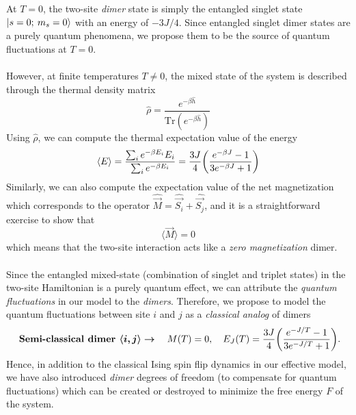 \documentclass[../journal_main.tex]{subfiles}
\begin{document}
At $T=0$, the two-site \textit{dimer} state is simply the entangled singlet state $\ket{s = 0; \: m_s = 0}$ with an energy of $-3J/4$. Since entangled singlet dimer states are a purely quantum phenomena, we propose them to be the source of quantum fluctuations at $T = 0$.~\\~\\
However, at finite temperatures $T \neq 0$, the mixed state of the system is described through the thermal density matrix 
\begin{equation}
    \hat{\rho} = \frac{e^{-\beta \hat{h}}}{\text{Tr} (e^{-\beta \hat{h}})}
\end{equation}
Using $\hat{\rho}$, we can compute the thermal expectation value of the energy 
\begin{equation}
    \expval{E} = \frac{\sum_i e^{-\beta E_i} E_i}{\sum_i e^{-\beta E_i}} = \frac{3J}{4}\qty(\frac{e^{-\beta J} - 1}{3e^{-\beta J} + 1})
\end{equation}
Similarly, we can also compute the expectation value of the net magnetization which corresponds to the operator $\hat{\vec{M}} = \hat{\vec{S_i}} + \hat{\vec{S_j}}$, and it is a straightforward exercise to show that
\begin{equation}
    \langle\vec{M}\rangle = 0 
\end{equation}
which means that the two-site interaction acts like a \textit{zero magnetization} dimer.~\\~\\
Since the entangled mixed-state (combination of singlet and triplet states) in the two-site Hamiltonian is a purely quantum effect, we can attribute the \textit{quantum fluctuations} in our model to the \textit{dimers}. Therefore, we propose to model the quantum fluctuations between site $i$ and $j$ as a \textit{classical analog} of dimers 
\begin{equation}
    \text{ \textbf{Semi-classical dimer }} \boldsymbol{\langle i,j\rangle \rightarrow} \quad M(T)=0, \quad E_J(T) = \frac{3J}{4}\qty(\frac{e^{-J/T} - 1}{3e^{-J/T} + 1}).
    \label{dimer}
\end{equation}
Hence, in addition to the classical Ising spin flip dynamics in our effective model, we have also introduced \textit{dimer} degrees of freedom (to compensate for quantum fluctuations) which can be created or destroyed to minimize the free energy $F$ of the system.
\end{document}
